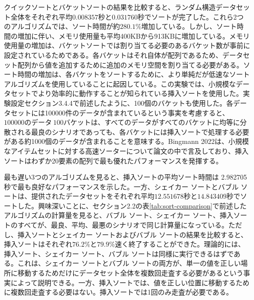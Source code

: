\documentclass[a4j, 11pt]{jarticle}
\begin{document}
クイックソートとバケットソートの結果を比較すると、ランダム構造データセット全体をそれぞれ平均$0.008357$秒と$0.031760$秒でソートが完了した。これら2つのアルゴリズムでは、ソート時間が約$280.1\%$増加している。しかし、ソート時間の増加に伴い、メモリ使用量も平均400KBから913KBに増加している。メモリ使用量の増加は、バケットソートでは割り当てる必要のあるバケット数が事前に設定されているためである。各バケットはそれ自体が配列であるため、データセット配列から値を追加するために追加のメモリ空間を割り当てる必要がある。ソート時間の増加は、各バケットをソートするために、より単純だが低速なソートアルゴリズムを使用していることに起因している。この実験では、小規模なデータセットでより効率的に動作することが知られている挿入ソートを使用した\cite{bingmann2020faster}。実験設定セクション3.4.4で前述したように、100個のバケットも使用した。各データセットには100000件のデータが含まれているという事実を考慮すると、$100000のデータ \ 100バケット$は、すべてのデータがすべてのバケットに均等に分散される最良のシナリオであっても、各バケットには挿入ソートで処理する必要がある約1000個のデータが含まれることを意味する。Bingmann 2022は、小規模なアイテムセットに対する高速ソーターについて論文の中で言及しており、挿入ソートはわずか20要素の配列で最も優れたパフォーマンスを発揮する。\

最も遅い3つのアルゴリズムを見ると、挿入ソートの平均ソート時間は 2.982705 秒で最も良好なパフォーマンスを示した。一方、シェイカー ソートとバブル ソートは、提供されたデータセットをそれぞれ平均$12.551678$秒と$14.843409$秒でソートした。興味深いことに、セクション2.2の表\ref{tab:sort-comparison}で前述したアルゴリズムの計算量を見ると、バブル ソート、シェイカー ソート、挿入ソートのすべてが、最良、平均、最悪のシナリオで同じ計算量になっている。ただし、挿入ソートとシェイカー ソートおよびバブル ソートの結果を比較すると、挿入ソートはそれぞれ$76.2\%$と$79.9\%$速く終了することができた。理論的には、挿入ソート、シェイカー ソート、バブル ソートは同様に実行できるはずである。これは、シェイカー ソートとバブル ソートの両方が、単一の値を正しい場所に移動するためだけにデータセット全体を複数回走査する必要があるという事実によって説明できる。一方、挿入ソートでは、値を正しい位置に移動するために複数回走査する必要はない。挿入ソートでは1回のみ走査が必要である。\
\end{document}
